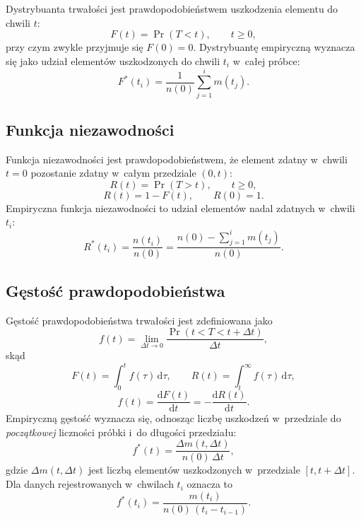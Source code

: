 Dystrybuanta trwałości jest prawdopodobieństwem uszkodzenia elementu do chwili $t$:
\begin{equation}
  F(t) = \Pr(T < t), \qquad t \geq 0, \tag{5-1}
\end{equation}
przy czym zwykle przyjmuje się $F(0) = 0$. Dystrybuantę empiryczną wyznacza się jako
udział elementów uszkodzonych do chwili $t_i$ w~całej próbce:
\begin{equation}
  F^*(t_i) = \frac{1}{n(0)} \sum_{j=1}^{i} m(t_j). \tag{5-2}
\end{equation}

\subsection{Funkcja niezawodności}

Funkcja niezawodności jest prawdopodobieństwem, że element zdatny w~chwili $t = 0$
pozostanie zdatny w~całym przedziale $(0, t)$:
\begin{equation}
  R(t) = \Pr(T > t), \qquad t \geq 0, \tag{5-3}
\end{equation}
\begin{equation}
  R(t) = 1 - F(t), \qquad R(0) = 1. \tag{5-4}
\end{equation}
Empiryczna funkcja niezawodności to udział elementów nadal zdatnych w~chwili $t_i$:
\begin{equation}
  R^*(t_i) = \frac{n(t_i)}{n(0)} = \frac{n(0) - \sum_{j=1}^{i} m(t_j)}{n(0)}. \tag{5-5}
\end{equation}

\subsection{Gęstość prawdopodobieństwa}

Gęstość prawdopodobieństwa trwałości jest zdefiniowana jako
\begin{equation}
  f(t) = \lim_{\Delta t \to 0} \frac{\Pr(t < T < t + \Delta t)}{\Delta t}, \tag{5-6}
\end{equation}
skąd
\begin{equation}
  F(t) = \int_0^t f(\tau)\,\mathrm{d}\tau, \qquad
  R(t) = \int_t^\infty f(\tau)\,\mathrm{d}\tau, \tag{5-7}
\end{equation}
\begin{equation}
  f(t) = \frac{\mathrm{d}F(t)}{\mathrm{d}t} = -\frac{\mathrm{d}R(t)}{\mathrm{d}t}. \tag{5-8}
\end{equation}
Empiryczną gęstość wyznacza się, odnosząc liczbę uszkodzeń w~przedziale do
\emph{początkowej} liczności próbki i~do długości przedziału:
\begin{equation}
  f^*(t) = \frac{\Delta m(t, \Delta t)}{n(0)\,\Delta t}, \tag{5-9}
\end{equation}
gdzie $\Delta m(t, \Delta t)$ jest liczbą elementów uszkodzonych w~przedziale
$[t, t + \Delta t]$. Dla danych rejestrowanych w~chwilach $t_i$ oznacza to
\begin{equation*}
  f^*(t_i) = \frac{m(t_i)}{n(0)\,(t_i - t_{i-1})}.
\end{equation*}

